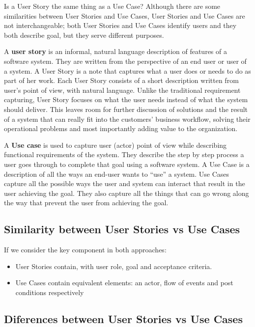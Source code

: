 \documentclass[
]{book}
\begin{document}
Is a User Story the same thing as a Use Case? Although there are some similarities between User Stories and Use Cases, User Stories and Use Cases are not interchangeable; both User Stories and Use Cases identify users and they both describe goal, but they serve different purposes.

A \textbf{user story} is an informal, natural language description of features of a software system. They are written from the perspective of an end user or user of a system. A User Story is a note that captures what a user does or needs to do as part of her work. Each User Story consists of a short description written from user's point of view, with natural language. Unlike the traditional requirement capturing, User Story focuses on what the user needs instead of what the system should deliver. This leaves room for further discussion of solutions and the result of a system that can really fit into the customers' business workflow, solving their operational problems and most importantly adding value to the organization.

A \textbf{Use case} is used to capture user (actor) point of view while describing functional requirements of the system. They describe the step by step process a user goes through to complete that goal using a software system. A Use Case is a description of all the ways an end-user wants to ``use'' a system. Use Cases capture all the possible ways the user and system can interact that result in the user achieving the goal. They also capture all the things that can go wrong along the way that prevent the user from achieving the goal.

\hypertarget{similarity-between-user-stories-vs-use-cases}{%
\subsection{Similarity between User Stories vs Use Cases}\label{similarity-between-user-stories-vs-use-cases}}

If we consider the key component in both approaches:

\begin{itemize}
\item
  User Stories contain, with user role, goal and acceptance criteria.
\item
  Use Cases contain equivalent elements: an actor, flow of events and post conditions respectively
\end{itemize}

\hypertarget{diferences-between-user-stories-vs-use-cases}{%
\subsection{Diferences between User Stories vs Use Cases}\label{diferences-between-user-stories-vs-use-cases}}
\end{document}

